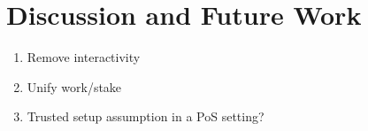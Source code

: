 \section{Discussion and Future Work}

\begin{enumerate}
  \item Remove interactivity
  \item Unify work/stake
  \item Trusted setup assumption in a PoS setting?
\end{enumerate}

